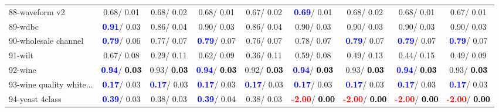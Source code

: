 \begin{table}[h]
\begin{center}
\begin{tabular}{lc|c|c|c|c|c|c|c}
88-waveform v2 &   0.68/  0.01 &   0.68/  0.02 &   0.68/  0.01 &   0.67/  0.02 & \textcolor{blue}{\textbf{  0.69}}/  0.01 &   0.68/  0.02 &   0.68/  0.01 &   0.67/  0.01 \\
89-wdbc & \textcolor{blue}{\textbf{  0.91}}/  0.03 &   0.86/  0.04 &   0.90/  0.03 &   0.86/  0.04 &   0.90/  0.03 &   0.90/  0.03 &   0.90/  0.03 &   0.90/  0.03 \\
90-wholesale channel & \textcolor{blue}{\textbf{  0.79}}/  0.06 &   0.77/  0.07 & \textcolor{blue}{\textbf{  0.79}}/  0.07 &   0.76/  0.07 &   0.78/  0.07 & \textcolor{blue}{\textbf{  0.79}}/  0.07 & \textcolor{blue}{\textbf{  0.79}}/  0.07 & \textcolor{blue}{\textbf{  0.79}}/  0.07 \\
91-wilt &   0.67/  0.08 &   0.29/  0.11 &   0.62/  0.09 &   0.36/  0.11 &   0.59/  0.08 &   0.49/  0.13 &   0.44/  0.15 &   0.49/  0.09 \\
92-wine & \textcolor{blue}{\textbf{  0.94}}/\textcolor{black}{\textbf{  0.03}} &   0.93/\textcolor{black}{\textbf{  0.03}} & \textcolor{blue}{\textbf{  0.94}}/\textcolor{black}{\textbf{  0.03}} &   0.92/\textcolor{black}{\textbf{  0.03}} & \textcolor{blue}{\textbf{  0.94}}/\textcolor{black}{\textbf{  0.03}} &   0.93/\textcolor{black}{\textbf{  0.03}} & \textcolor{blue}{\textbf{  0.94}}/\textcolor{black}{\textbf{  0.03}} &   0.93/\textcolor{black}{\textbf{  0.03}} \\ \hline
93-wine quality white... & \textcolor{blue}{\textbf{  0.17}}/  0.03 & \textcolor{blue}{\textbf{  0.17}}/  0.03 & \textcolor{blue}{\textbf{  0.17}}/  0.03 & \textcolor{blue}{\textbf{  0.17}}/  0.03 & \textcolor{blue}{\textbf{  0.17}}/  0.03 & \textcolor{blue}{\textbf{  0.17}}/  0.03 & \textcolor{blue}{\textbf{  0.17}}/  0.03 & \textcolor{blue}{\textbf{  0.17}}/  0.03 \\
94-yeast 4class & \textcolor{blue}{\textbf{  0.39}}/  0.03 &   0.38/  0.03 & \textcolor{blue}{\textbf{  0.39}}/  0.04 &   0.38/  0.03 & \textcolor{red}{\textbf{ -2.00}}/\textcolor{black}{\textbf{  0.00}} & \textcolor{red}{\textbf{ -2.00}}/\textcolor{black}{\textbf{  0.00}} & \textcolor{red}{\textbf{ -2.00}}/\textcolor{black}{\textbf{  0.00}} & \textcolor{red}{\textbf{ -2.00}}/\textcolor{black}{\textbf{  0.00}} \\\end{tabular}\label{stratsALCKappa2bRF}
\end{center}
\end{table}